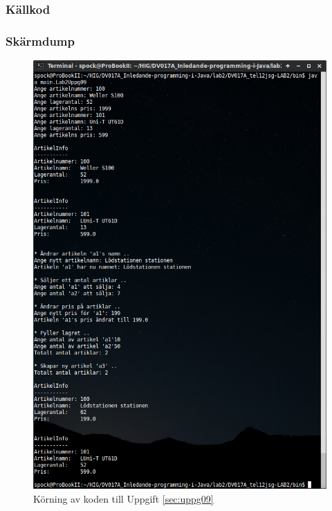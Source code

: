 \subsubsection{Källkod}
\label{src:uppg09}

\label{src:artikel}


\subsubsection{Skärmdump}
\begin{figure}[htbp]
    \centering
        \includegraphics[width=\linewidth]{img/09.png}
    \caption{Körning av koden till Uppgift \ref{sec:uppg09}}
    \label{fig:uppg09-screenshot}
\end{figure}

